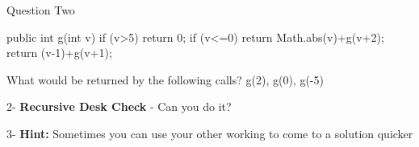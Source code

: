 \begin{topic}{Question Two}

\begin{java}
public int g(int v) {
    if (v>5) {
        return 0;
    }
    if (v<=0) {
        return Math.abs(v)+g(v+2);
    }
    return (v-1)+g(v+1);
}
\end{java}

What would be returned by the following calls? g(2), g(0), g(-5)

\begin{subtopic}{2-}
\textbf{Recursive Desk Check} - Can you do it?
\end{subtopic}

\begin{subtopic}{3-}
\textbf{Hint:} Sometimes you can use your other working to come to a solution quicker
\end{subtopic}

\end{topic}